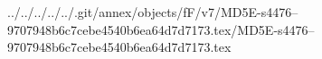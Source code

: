../../../../../.git/annex/objects/fF/v7/MD5E-s4476--9707948b6c7cebe4540b6ea64d7d7173.tex/MD5E-s4476--9707948b6c7cebe4540b6ea64d7d7173.tex